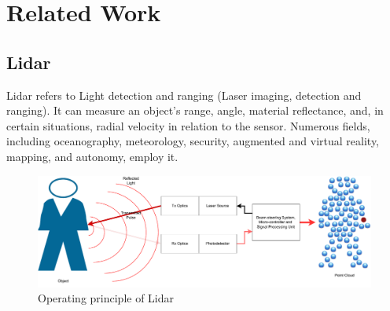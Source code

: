 \chapter{Related Work}

\section{Lidar}
Lidar refers to Light detection and ranging (Laser imaging, detection and ranging). It can measure an object's range, angle, material reflectance, and, in certain situations, radial velocity in relation to the sensor. Numerous fields, including oceanography, meteorology, security, augmented and virtual reality, mapping, and autonomy, employ it.
\begin{figure}[htbp]
    \centering
    \includegraphics[width=0.8\linewidth]{97_graphics/related_work/lidar_principle.pdf}
    \caption{Operating principle of Lidar}
    \label{fig:related_work-lidar}
\end{figure}

